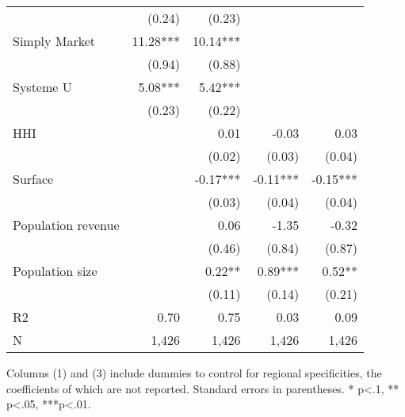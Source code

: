 \documentclass[english]{article}
\begin{document}
\begin{table}
\begin{threeparttable}
\begin{tabular}{lrrrr}
                                                        & (0.24)    & (0.23)   &           &            \\
Simply Market                                           & 11.28***  & 10.14*** &           &            \\
                                                        & (0.94)    & (0.88)   &           &            \\
Systeme U                                               & 5.08***   & 5.42***  &           &            \\
                                                        & (0.23)    & (0.22)   &           &            \\
HHI                                                     &           & 0.01     & -0.03     & 0.03       \\
                                                        &           & (0.02)   & (0.03)    & (0.04)     \\
Surface                                                 &           & -0.17*** & -0.11***  & -0.15***   \\
                                                        &           & (0.03)   & (0.04)    & (0.04)     \\
Population revenue                                      &           & 0.06     & -1.35     & -0.32      \\
                                                        &           & (0.46)   & (0.84)    & (0.87)     \\
Population size                                         &           & 0.22**   & 0.89***   & 0.52**     \\
                                                        &           & (0.11)   & (0.14)    & (0.21)     \\
\midrule
R2                                                      & 0.70      & 0.75     & 0.03      & 0.09       \\
N                                                       & 1,426     & 1,426    & 1,426     & 1,426      \\
\bottomrule
\bottomrule
\end{tabular}
\begin{tablenotes}
      \small
      \item Columns (1) and (3) include dummies to control for regional specificities, the coefficients of which are not reported. Standard errors in parentheses. * p<.1, ** p<.05, ***p<.01.
\end{tablenotes}
\end{threeparttable}
\end{table}
\end{document}
